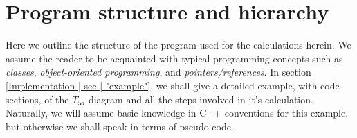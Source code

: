 \documentclass[10pt,twoside]{report}
\begin{document}

	
	\section{Program structure and hierarchy}
	Here we outline the structure of the program used for the calculations herein. We assume the reader to be acquainted with typical programming concepts such as \emph{classes}, \emph{object-oriented programming}, and \emph{pointers/references}. In section \ref{Implementation | sec | "example"}, we shall give a detailed example, with code sections, of the $T_{5a}$ diagram and all the steps involved in it's calculation. Naturally, we will assume basic knowledge in C++ conventions for this example, but otherwise we shall speak in terms of pseudo-code.
	
\end{document}
